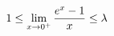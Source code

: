 \documentclass[preview]{standalone}
\begin{document}
\begin{align*}
\special{dvisvgm:raw <g id='unique000'>}1 \leq \lim_{x \rightarrow 0^+} \frac{e^x - 1}{x} \leq \lambda\special{dvisvgm:raw </g>}
\end{align*}
\end{document}
